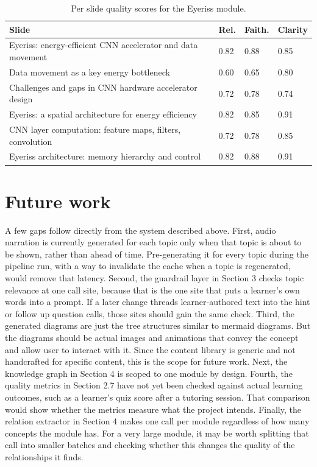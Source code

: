 \documentclass{ecai}
\begin{document}
\begin{table}[h]
\caption{Per slide quality scores for the Eyeriss module.}
\label{tab:eyeriss-slides}
\centering
\small
\begin{tabular}{p{4.0cm}p{0.9cm}p{0.9cm}p{0.9cm}}
\toprule
\textbf{Slide} & \textbf{Rel.} & \textbf{Faith.} & \textbf{Clarity} \\
\midrule
Eyeriss: energy-efficient CNN accelerator and data movement & 0.82 & 0.88 & 0.85 \\
Data movement as a key energy bottleneck & 0.60 & 0.65 & 0.80 \\
Challenges and gaps in CNN hardware accelerator design & 0.72 & 0.78 & 0.74 \\
Eyeriss: a spatial architecture for energy efficiency & 0.82 & 0.85 & 0.91 \\
CNN layer computation: feature maps, filters, convolution & 0.72 & 0.78 & 0.85 \\
Eyeriss architecture: memory hierarchy and control & 0.82 & 0.88 & 0.91 \\
\bottomrule
\end{tabular}
\end{table}

\section{Future work}

A few gaps follow directly from the system described above. First, audio
narration is currently generated for each topic only when that topic is about
to be shown, rather than ahead of time. Pre-generating it for every topic
during the pipeline run, with a way to invalidate the cache when a topic is
regenerated, would remove that latency. Second, the guardrail layer in Section 3 
checks topic relevance at one call site, because that is the one site that puts a 
learner's own words into a prompt. If a later change threads learner-authored text 
into the hint or follow up question calls, those sites should gain the same check. 
Third, the generated diagrams are just the tree structures similar to mermaid diagrams. 
But the diagrams should be actual images and animations that convey the concept and 
allow user to interact with it. Since the content library is generic and not handcrafted for 
specific content, this is the scope for future work. Next, the knowledge graph in Section 4
is scoped to one module by design. Fourth, the quality metrics in Section 2.7 have not yet
been checked against actual learning outcomes, such as a learner's quiz score
after a tutoring session. That comparison would show whether the metrics
measure what the project intends. Finally, the relation extractor in Section 4
makes one call per module regardless of how many concepts the module has. For a
very large module, it may be worth splitting that call into smaller batches and
checking whether this changes the quality of the relationships it finds.
\end{document}
